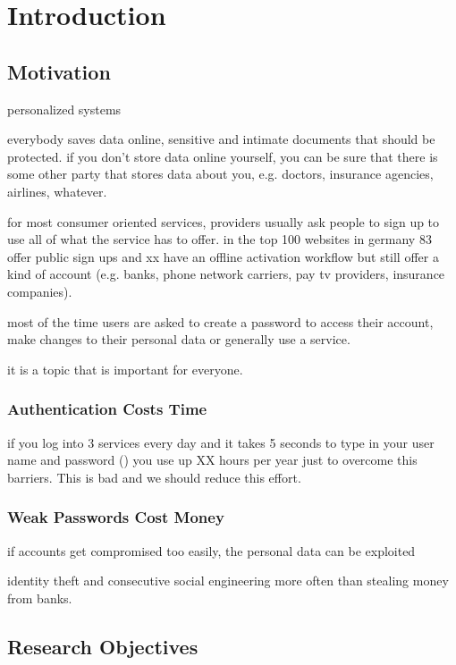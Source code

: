 
\chapter[Introduction]{Introduction}\label{chap:intro}


\section{Motivation}
personalized systems

everybody saves data online, sensitive and intimate documents that should be protected.
if you don't store data online yourself, you can be sure that there is some other party
that stores data about you, e.g. doctors, insurance agencies, airlines, whatever. 

for most consumer oriented services, providers usually ask people to sign up to use
all of what the service has to offer. in the top 100 websites in germany 83 offer public sign ups and xx have an offline activation workflow but still offer a kind of account (e.g. banks, phone network carriers, pay tv providers, insurance companies). 

most of the time users are asked to create a password to access their account, make changes to their personal data or generally use a service. 


it is a topic that is important for everyone. 

\subsection{Authentication Costs Time}
if you log into 3 services every day and it takes 5 seconds to type in your user name and password (\ar) you use up XX hours per year just to overcome this barriers. This is bad and we should reduce this effort. 


\subsection{Weak Passwords Cost Money}
if accounts get compromised too easily, the personal data can be exploited 

identity theft and consecutive social engineering more often than stealing money from banks.



\section{Research Objectives}

